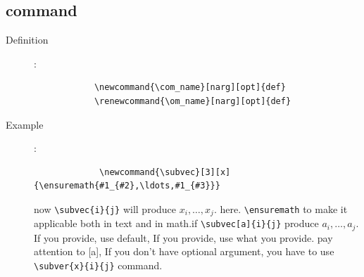 \documentclass[a4paper,12pt,twoside]{book}
\begin{document}
	\subsection{command}
		\begin{description}
		\item[Definition]:
			\begin{verbatim}
			\newcommand{\com_name}[narg][opt]{def}
			\renewcommand{\om_name}[narg][opt]{def}
			\end{verbatim}
		\item[Example]:
			\begin{verbatim}
			 \newcommand{\subvec}[3][x]{\ensuremath{#1_{#2},\ldots,#1_{#3}}}
			\end{verbatim}
			 \newcommand{\subvec}[3][x]{\ensuremath{#1_{#2},\ldots,#1_{#3}}}
			now \verb=\subvec{i}{j}= will produce
			\subvec{i}{j}. here. \verb=\ensuremath= to make
it applicable both in text and in
math.if \verb=\subvec[a]{i}{j}= produce \subvec[a]{i}{j}.
If you provide, use default, If you provide, use what you provide.  pay attention to [a], If you don't have optional argument, you have to use \verb=\subver{x}{i}{j}= command.

		\end{description}
		
\end{document}
